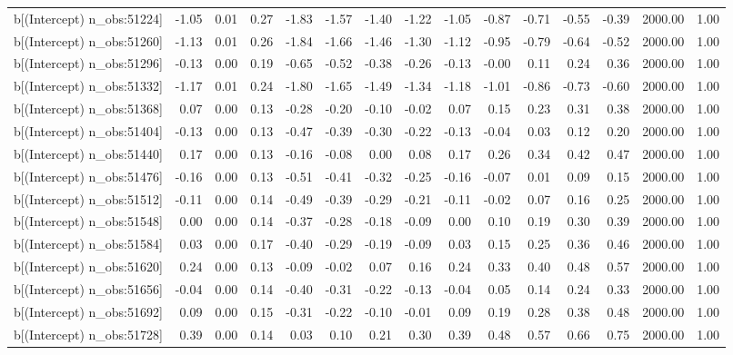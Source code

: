 \begin{table}[ht]
\begin{tabular}{rrrrrrrrrrrrrrr}
  b[(Intercept) n\_obs:51224] & -1.05 & 0.01 & 0.27 & -1.83 & -1.57 & -1.40 & -1.22 & -1.05 & -0.87 & -0.71 & -0.55 & -0.39 & 2000.00 & 1.00 \\ 
  b[(Intercept) n\_obs:51260] & -1.13 & 0.01 & 0.26 & -1.84 & -1.66 & -1.46 & -1.30 & -1.12 & -0.95 & -0.79 & -0.64 & -0.52 & 2000.00 & 1.00 \\ 
  b[(Intercept) n\_obs:51296] & -0.13 & 0.00 & 0.19 & -0.65 & -0.52 & -0.38 & -0.26 & -0.13 & -0.00 & 0.11 & 0.24 & 0.36 & 2000.00 & 1.00 \\ 
  b[(Intercept) n\_obs:51332] & -1.17 & 0.01 & 0.24 & -1.80 & -1.65 & -1.49 & -1.34 & -1.18 & -1.01 & -0.86 & -0.73 & -0.60 & 2000.00 & 1.00 \\ 
  b[(Intercept) n\_obs:51368] & 0.07 & 0.00 & 0.13 & -0.28 & -0.20 & -0.10 & -0.02 & 0.07 & 0.15 & 0.23 & 0.31 & 0.38 & 2000.00 & 1.00 \\ 
  b[(Intercept) n\_obs:51404] & -0.13 & 0.00 & 0.13 & -0.47 & -0.39 & -0.30 & -0.22 & -0.13 & -0.04 & 0.03 & 0.12 & 0.20 & 2000.00 & 1.00 \\ 
  b[(Intercept) n\_obs:51440] & 0.17 & 0.00 & 0.13 & -0.16 & -0.08 & 0.00 & 0.08 & 0.17 & 0.26 & 0.34 & 0.42 & 0.47 & 2000.00 & 1.00 \\ 
  b[(Intercept) n\_obs:51476] & -0.16 & 0.00 & 0.13 & -0.51 & -0.41 & -0.32 & -0.25 & -0.16 & -0.07 & 0.01 & 0.09 & 0.15 & 2000.00 & 1.00 \\ 
  b[(Intercept) n\_obs:51512] & -0.11 & 0.00 & 0.14 & -0.49 & -0.39 & -0.29 & -0.21 & -0.11 & -0.02 & 0.07 & 0.16 & 0.25 & 2000.00 & 1.00 \\ 
  b[(Intercept) n\_obs:51548] & 0.00 & 0.00 & 0.14 & -0.37 & -0.28 & -0.18 & -0.09 & 0.00 & 0.10 & 0.19 & 0.30 & 0.39 & 2000.00 & 1.00 \\ 
  b[(Intercept) n\_obs:51584] & 0.03 & 0.00 & 0.17 & -0.40 & -0.29 & -0.19 & -0.09 & 0.03 & 0.15 & 0.25 & 0.36 & 0.46 & 2000.00 & 1.00 \\ 
  b[(Intercept) n\_obs:51620] & 0.24 & 0.00 & 0.13 & -0.09 & -0.02 & 0.07 & 0.16 & 0.24 & 0.33 & 0.40 & 0.48 & 0.57 & 2000.00 & 1.00 \\ 
  b[(Intercept) n\_obs:51656] & -0.04 & 0.00 & 0.14 & -0.40 & -0.31 & -0.22 & -0.13 & -0.04 & 0.05 & 0.14 & 0.24 & 0.33 & 2000.00 & 1.00 \\ 
  b[(Intercept) n\_obs:51692] & 0.09 & 0.00 & 0.15 & -0.31 & -0.22 & -0.10 & -0.01 & 0.09 & 0.19 & 0.28 & 0.38 & 0.48 & 2000.00 & 1.00 \\ 
  b[(Intercept) n\_obs:51728] & 0.39 & 0.00 & 0.14 & 0.03 & 0.10 & 0.21 & 0.30 & 0.39 & 0.48 & 0.57 & 0.66 & 0.75 & 2000.00 & 1.00 \\ 

\end{tabular}
\end{table}
